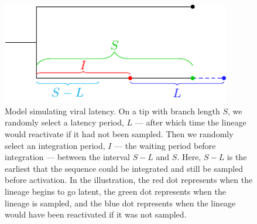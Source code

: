 \documentclass[12pt]{article}
\begin{document}
\clearpage

\begin{figure}[p]
	\centering{}
	\includegraphics[width=10cm]{figures/latency-model}
	\caption[Latency Model]{
	{Model simulating viral latency.}
	On a tip with branch length $S$, we randomly select a latency period, $L$ --- after which time the lineage would reactivate if it had not been sampled.
	Then we randomly select an integration period, $I$ --- the waiting period before integration --- between the interval $S-L$ and $S$.
	Here, $S-L$ is the earliest that the sequence could be integrated and still be sampled before activation.
	In the illustration, the red dot represents when the lineage begins to go latent, the green dot represents when the lineage is sampled, and the blue dot represents when the lineage would have been reactivated if it was not sampled.
	}
	\label{fig:latencymodel}
\end{figure}

\clearpage
\end{document}

